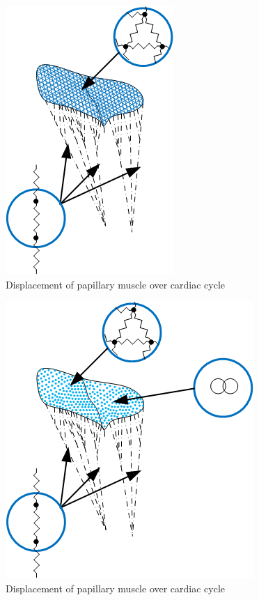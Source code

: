 \begin{figure}[H]\label{fig:pc2}
  \centering
  \includegraphics[width=0.35\columnwidth]{./fig/pc2.png}
  \caption{Displacement of papillary muscle over cardiac cycle}
\end{figure}
\begin{figure}[H]\label{fig:pc3}
  \centering
  \includegraphics[width=0.45\columnwidth]{./fig/pc3.png}
  \caption{Displacement of papillary muscle over cardiac cycle}
\end{figure}
